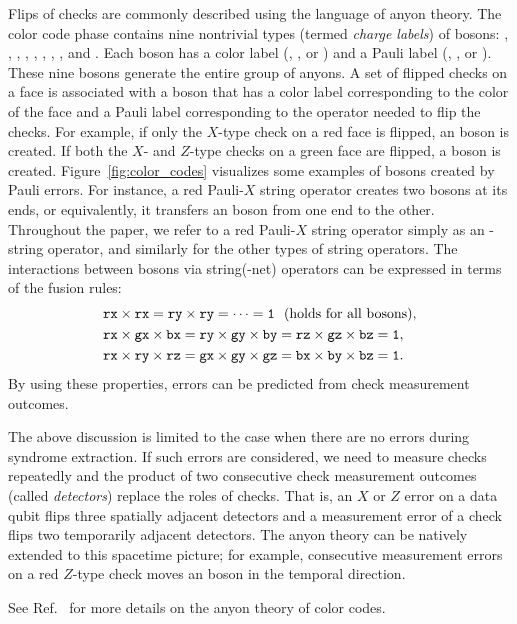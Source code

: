 \documentclass[
 prx,
 reprint,
 superscriptaddress,
 longbibliography,
 dvipsnames
]{revtex4-2}
\begin{document}
Flips of checks are commonly described using the language of anyon theory. 
The color code phase contains nine nontrivial types (termed \textit{charge labels}) of bosons: \rx, \ry, \rz, \gx, \gy, \gz, \bx, \by, and \bz. 
Each boson has a color label (\rbs, \gbs, or \bbs) and a Pauli label (\xbs, \ybs, or \zbs). 
These nine bosons generate the entire group of anyons. 
A set of flipped checks on a face is associated with a boson that has a color label corresponding to the color of the face and a Pauli label corresponding to the operator needed to flip the checks. 
For example, if only the $X$-type check on a red face is flipped, an \rz boson is created. 
If both the $X$- and $Z$-type checks on a green face are flipped, a \gy boson is created.
Figure~\ref{fig:color_codes} visualizes some examples of bosons created by Pauli errors.
For instance, a red Pauli-$X$ string operator creates two \rx bosons at its ends, or equivalently, it transfers an \rx boson from one end to the other. 
Throughout the paper, we refer to a red Pauli-$X$ string operator simply as an \rx-string operator, and similarly for the other types of string operators. 
The interactions between bosons via string(-net) operators can be expressed in terms of the fusion rules:
\begin{align*}
&\texttt{rx} \times \texttt{rx} = \texttt{ry} \times \texttt{ry} = \cdots = \texttt{1}~~\text{(holds for all bosons)}, \\
&\texttt{rx} \times \texttt{gx} \times \texttt{bx} = \texttt{ry} \times \texttt{gy} \times \texttt{by} = \texttt{rz} \times \texttt{gz} \times \texttt{bz} = \texttt{1}, \\
&\texttt{rx} \times \texttt{ry} \times \texttt{rz} = \texttt{gx} \times \texttt{gy} \times \texttt{gz} = \texttt{bx} \times \texttt{by} \times \texttt{bz} = \texttt{1}.
\end{align*}
By using these properties, errors can be predicted from check measurement outcomes.

The above discussion is limited to the case when there are no errors during syndrome extraction.
If such errors are considered, we need to measure checks repeatedly and the product of two consecutive check measurement outcomes (called \textit{detectors}) replace the roles of checks.
That is, an $X$ or $Z$ error on a data qubit flips three spatially adjacent detectors and a measurement error of a check flips two temporarily adjacent detectors.
The anyon theory can be natively extended to this spacetime picture; for example, consecutive measurement errors on a red $Z$-type check moves an \rx boson in the temporal direction.

See Ref.~\cite{kesselring2022anyon} for more details on the anyon theory of color codes.
\end{document}
